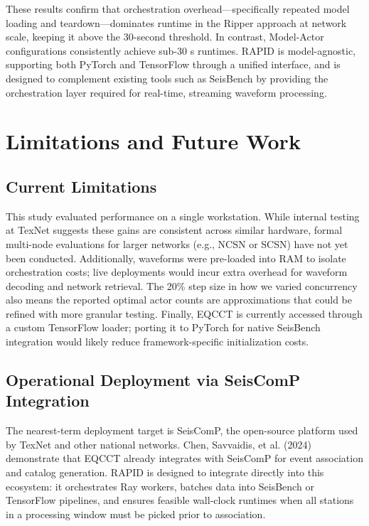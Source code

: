 These results confirm that orchestration overhead—specifically repeated model loading and teardown—dominates runtime in the Ripper approach at network scale, keeping it above the 30-second threshold. In contrast, Model-Actor configurations consistently achieve sub-30 s runtimes. RAPID is model-agnostic, supporting both PyTorch and TensorFlow through a unified interface, and is designed to complement existing tools such as SeisBench by providing the orchestration layer required for real-time, streaming waveform processing.


\section{Limitations and Future Work}

\subsection{Current Limitations}

This study evaluated performance on a single workstation. While internal testing at TexNet suggests these gains are consistent across similar hardware, formal multi-node evaluations for larger networks (e.g., NCSN or SCSN) have not yet been conducted. Additionally, waveforms were pre-loaded into RAM to isolate orchestration costs; live deployments would incur extra overhead for waveform decoding and network retrieval. The 20\% step size in how we varied concurrency also means the reported optimal actor counts are approximations that could be refined with more granular testing. Finally, EQCCT is currently accessed through a custom TensorFlow loader; porting it to PyTorch for native SeisBench integration would likely reduce framework-specific initialization costs.

\subsection{Operational Deployment via SeisComP Integration}

The nearest-term deployment target is SeisComP, the open-source platform used by TexNet and other national networks. Chen, Savvaidis, et al. (2024) demonstrate that EQCCT already integrates with SeisComP for event association and catalog generation. RAPID is designed to integrate directly into this ecosystem: it orchestrates Ray workers, batches data into SeisBench or TensorFlow pipelines, and ensures feasible wall-clock runtimes when all stations in a processing window must be picked prior to association.

